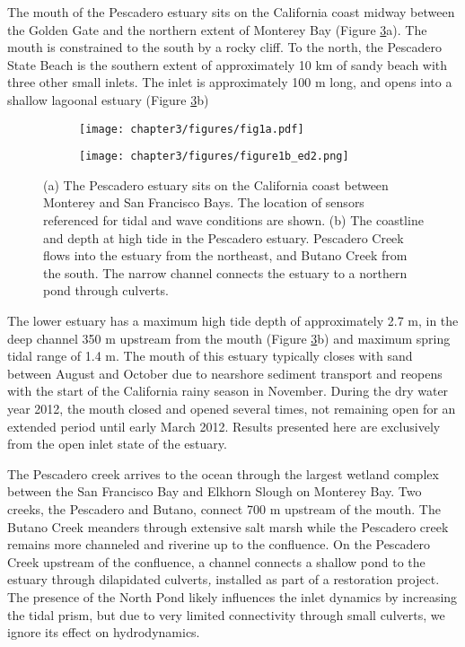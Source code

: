 The mouth of the Pescadero estuary sits on the California coast midway
between the Golden Gate and the northern extent of Monterey Bay (Figure
\ref{f1_maps}a). The mouth is constrained to the south by a rocky
cliff. To the north, the Pescadero State Beach is the southern extent
of approximately 10 km of sandy beach with three other small inlets.
The inlet is approximately 100 m long, and opens into a shallow lagoonal
estuary (Figure \ref{f1_maps}b) 


\begin{figure}[tp]
\begin{subfigure}{.5\textwidth}
	\centering
	\texttt{[image: chapter3/figures/fig1a.pdf]}
	\label{fig:sfig1a_coastline}
\end{subfigure}
\begin{subfigure}{.5\textwidth}
	\centering
	\texttt{[image: chapter3/figures/figure1b\_ed2.png]}
	\label{fig:sfig1b_pdomap}
\end{subfigure}
\caption{(a) The Pescadero estuary sits on the California coast between Monterey
and San Francisco Bays. The location of sensors referenced for tidal
and wave conditions are shown. (b) The coastline and depth at high
tide in the Pescadero estuary. Pescadero Creek flows into the estuary
from the northeast, and Butano Creek from the south. The narrow channel
connects the estuary to a northern pond through culverts.}
\label{f1_maps}
\end{figure}


The lower estuary has a maximum high tide depth of approximately 2.7
m, in the deep channel 350 m upstream from the mouth (Figure \ref{f1_maps}b) and maximum spring tidal range of 1.4 m. The mouth of this estuary
typically closes with sand between August and October due to nearshore
sediment transport and reopens with the start of the California rainy
season in November. During the dry water year 2012, the mouth closed and opened
several times, not remaining open for an extended period until early
March 2012. Results presented here are exclusively from the open inlet
state of the estuary. 

The Pescadero creek arrives to the ocean through the largest wetland
complex between the San Francisco Bay and Elkhorn Slough on Monterey
Bay. Two creeks, the Pescadero and Butano, connect 700 m upstream
of the mouth. The Butano Creek meanders through extensive salt marsh
while the Pescadero creek remains more channeled and riverine up to
the confluence. On the Pescadero Creek upstream of the confluence,
a channel connects a shallow pond to the estuary through dilapidated
culverts\emph{, }installed as part of a restoration project. The presence
of the North Pond likely influences the inlet dynamics by increasing
the tidal prism, but due to very limited connectivity through small
culverts, we ignore its effect on hydrodynamics.

